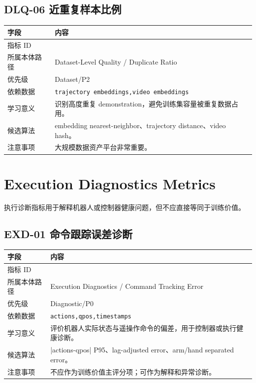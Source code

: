 \documentclass[UTF8,zihao=-4]{ctexart}
\newcommand{\Code}[1]{\texttt{#1}}
\newcommand{\MID}[1]{\texttt{\seqsplit{#1}}}
\begin{document}
\subsection{DLQ-06 近重复样本比例}

\begin{longtable}{L{3.6cm} L{9.6cm}}
\toprule
字段 & 内容 \\
\midrule
指标 ID & \MID{DLQ-06} \\
所属本体路径 & Dataset-Level Quality / Duplicate Ratio \\
优先级 & Dataset/P2 \\
依赖数据 & \Code{trajectory embeddings,video embeddings} \\
学习意义 & 识别高度重复 demonstration，避免训练集容量被重复数据占用。 \\
候选算法 & embedding nearest-neighbor、trajectory distance、video hash。 \\
注意事项 & 大规模数据资产平台非常重要。 \\
\bottomrule
\end{longtable}

\section{Execution Diagnostics Metrics}

执行诊断指标用于解释机器人或控制器健康问题，但不应直接等同于训练价值。


\subsection{EXD-01 命令跟踪误差诊断}

\begin{longtable}{L{3.6cm} L{9.6cm}}
\toprule
字段 & 内容 \\
\midrule
指标 ID & \MID{EXD-01} \\
所属本体路径 & Execution Diagnostics / Command Tracking Error \\
优先级 & Diagnostic/P0 \\
依赖数据 & \Code{actions,qpos,timestamps} \\
学习意义 & 评价机器人实际状态与遥操作命令的偏差，用于控制器或执行健康诊断。 \\
候选算法 & |actions-qpos| P95、lag-adjusted error、arm/hand separated error。 \\
注意事项 & 不应作为训练价值主评分项；可作为解释和异常诊断。 \\
\bottomrule
\end{longtable}
\end{document}
